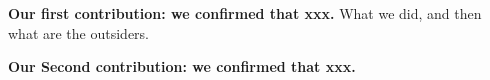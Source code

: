 \textbf{Our first contribution: we confirmed that xxx.} What we did, and then what are the outsiders.

\textbf{Our Second contribution: we confirmed that xxx.} 



